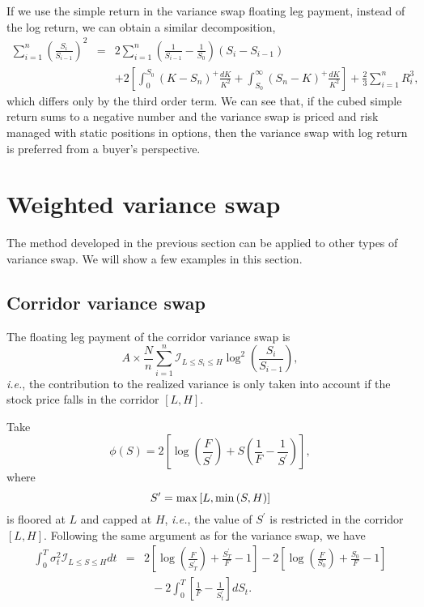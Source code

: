 \documentclass[12pt]{article}
\begin{document}
    If we use the simple return in the variance swap floating leg payment, instead of the log return, we can obtain a similar decomposition,
    \begin{eqnarray}
      \sum_{i=1}^n\left(\frac{S_i}{S_{i-1}}\right)^2&=&2\sum_{i=1}^n\left(\frac{1}{S_{i-1}}-\frac{1}{S_0}\right)(S_i-S_{i-1})\nonumber\\
          && + 2\left[\int_0^{S_0}\left(K-S_n\right)^+\frac{dK}{K^2}+\int_{S_0}^{\infty}\left(S_n-K\right)^+\frac{dK}{K^2}\right]+\frac{2}{3}\sum_{i=1}^nR_i^3,
    \end{eqnarray}
    which differs only by the third order term. We can see that, if the cubed simple return sums to a negative number and the variance swap is priced and risk
    managed with static positions in options, then the variance swap with log return is preferred from a buyer's perspective.


\section{Weighted variance swap}

  The method developed in the previous section can be applied to other types of variance swap. We will show a few examples in
  this section.

  \subsection{Corridor variance swap}

    The floating leg payment of the corridor variance swap is
    \begin{equation}
      A\times\frac{N}{n}\sum_{i=1}^{n}\mathcal{I}_{L\leq S_i \leq H}\log^2\left(\frac{S_i}{S_{i-1}}\right),
    \end{equation}
    {\it i.e.}, the contribution to the realized variance is only taken into account if the stock price falls
    in the corridor $[L,H]$.

    Take \cite{CarrMadan}
    \begin{equation}
      \phi(S) = 2\left[\log\left(\frac{F}{S^{\prime}}\right)+S\left(\frac{1}{F}-\frac{1}{S^{\prime}}\right)\right],
    \end{equation}
    where
    \begin{equation}
      S^{\prime} = {\rm max}\left[L, {\rm min}\left(S,H\right)\right]
    \end{equation}
    is floored at $L$ and capped at $H$, {\it i.e.}, the value of $S^{\prime}$ is restricted in the corridor $[L,H]$.
    Following the same argument as for the variance swap, we have
    \begin{eqnarray}
      \int_0^T\sigma_t^2\mathcal{I}_{L\leq S \leq H}dt &=& 2\left[\log\left(\frac{F}{S_T^{\prime}}\right)+\frac{S_T^{\prime}}{F}-1\right]
                                     - 2\left[\log\left(\frac{F}{S_0}\right)+\frac{S_0}{F}-1\right]\nonumber\\
                            && \ \ \ - 2\int_0^T\left[\frac{1}{F}-\frac{1}{S_t^{\prime}}\right]dS_t.
    \end{eqnarray}
\end{document}
